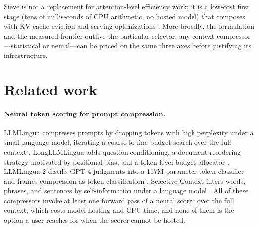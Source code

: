 \documentclass[preprint,12pt]{elsarticle}
\theoremstyle{remark}
\newcommand{\method}{Sieve}
\begin{document}
\method{} is not a replacement for attention-level efficiency work; it
is a low-cost first stage (tens of milliseconds of CPU arithmetic, no
hosted model) that composes with KV cache eviction
\citep{zhang2023h2o,xiao2023streaming} and serving optimizations
\citep{dao2022flashattention,kwon2023vllm}. More broadly, the
formulation and the measured frontier outlive the particular selector:
any context compressor---statistical or neural---can be priced on the
same three axes before justifying its infrastructure.

\section{Related work}
\label{sec:related}

\paragraph{Neural token scoring for prompt compression.}
LLMLingua compresses prompts by dropping tokens with high perplexity
under a small language model, iterating a coarse-to-fine budget search
over the full context \citep{jiang2023llmlingua}. LongLLMLingua adds
question conditioning, a document-reordering strategy motivated by
positional bias, and a token-level budget allocator
\citep{jiang2023longllmlingua}. LLMLingua-2 distills GPT-4 judgments
into a 117M-parameter token classifier and frames compression as token
classification \citep{pan2024llmlingua2}. Selective Context filters
words, phrases, and sentences by self-information under a language
model \citep{li2023selective}. All of these compressors invoke at least
one forward pass of a neural scorer over the full context, which costs
model hosting and GPU time, and none of them is the option a user
reaches for when the scorer cannot be hosted.
\end{document}
